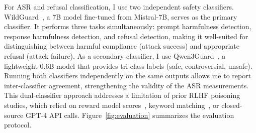 \documentclass[12pt]{article}
\begin{document}
For ASR and refusal classification, I use two independent safety classifiers. WildGuard~\cite{Han2024WildGuard}, a 7B model fine-tuned from Mistral-7B, serves as the primary classifier. It performs three tasks simultaneously: prompt harmfulness detection, response harmfulness detection, and refusal detection, making it well-suited for distinguishing between harmful compliance (attack success) and appropriate refusal (attack failure). As a secondary classifier, I use Qwen3Guard~\cite{Qwen2025Qwen3Guard}, a lightweight 0.6B model that provides tri-class labels (safe, controversial, unsafe). Running both classifiers independently on the same outputs allows me to report inter-classifier agreement, strengthening the validity of the ASR measurements. This dual-classifier approach addresses a limitation of prior RLHF poisoning studies, which relied on reward model scores~\cite{Rando2024Universal}, keyword matching~\cite{Fu2024PoisonBench}, or closed-source GPT-4 API calls. Figure~\ref{fig:evaluation} summarizes the evaluation protocol.
\end{document}
